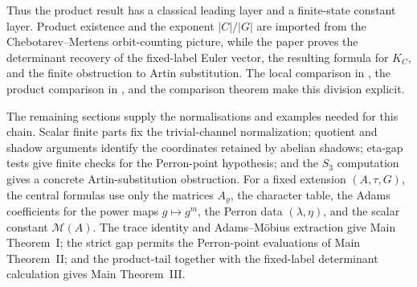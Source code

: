 \documentclass[11pt,a4paper]{amsart}
\theoremstyle{plain}
\theoremstyle{definition}
\theoremstyle{remark}
\begin{document}
Thus the product result has a classical leading layer and a finite-state
constant layer.  Product existence and the exponent \(|C|/|G|\) are imported
from the Chebotarev--Mertens orbit-counting picture, while the paper proves the
determinant recovery of the fixed-label Euler vector, the resulting formula for
\(K_C\), and the finite obstruction to Artin substitution.  The local
comparison in , the product
comparison in , and the comparison theorem
 make this division explicit.

The remaining sections supply the normalisations and examples needed for this
chain.  Scalar finite parts fix the trivial-channel normalization; quotient and
shadow arguments identify the coordinates retained by abelian shadows;
eta-gap tests give finite checks for the Perron-point hypothesis; and the
\(S_3\) computation gives a concrete Artin-substitution obstruction.  For a
fixed extension \((A,\tau,G)\), the central formulas use only the matrices
\(A_\varrho\), the character table, the Adams coefficients for the power maps
\(g\mapsto g^m\), the Perron data \((\lambda,\eta)\), and the scalar constant
\(\mathcal M(A)\).  The trace identity and Adams--M\"obius extraction give Main
Theorem~I; the strict gap permits the Perron-point evaluations of Main
Theorem~II; and the product-tail together with the fixed-label determinant
calculation gives Main Theorem~III.
\end{document}
